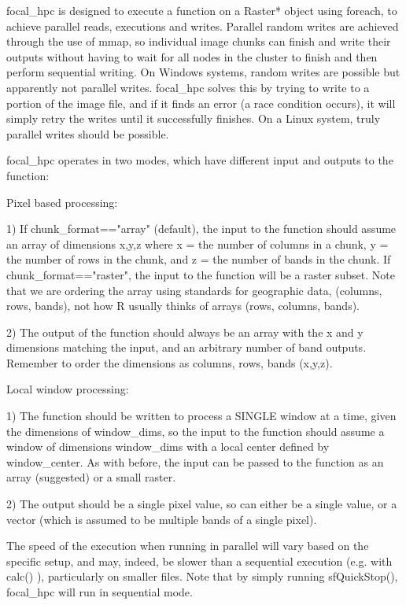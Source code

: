 \documentclass[a4paper]{book}
\begin{document}
\begin{Details}\relax
focal\_hpc is designed to execute a function on a Raster*
object using foreach, to achieve parallel reads,
executions and writes. Parallel random writes are
achieved through the use of mmap, so individual image
chunks can finish and write their outputs without having
to wait for all nodes in the cluster to finish and then
perform sequential writing.  On Windows systems, random
writes are possible but apparently not parallel writes.
focal\_hpc solves this by trying to write to a portion of
the image file, and if it finds an error (a race
condition occurs), it will simply retry the writes until
it successfully finishes.  On a Linux system, truly
parallel writes should be possible.

focal\_hpc operates in two modes, which have different
input and outputs to the function:

Pixel based processing:

1) If chunk\_format=="array" (default), the input to the
function should assume an array of dimensions x,y,z where
x = the number of columns in a chunk, y = the number of
rows in the chunk, and z = the number of bands in the
chunk.  If chunk\_format=="raster", the input to the
function will be a raster subset. Note that we are
ordering the array using standards for geographic data,
(columns, rows, bands), not how R usually thinks of
arrays (rows, columns, bands).

2) The output of the function should always be an array
with the x and y dimensions matching the input, and an
arbitrary number of band outputs.  Remember to order the
dimensions as columns, rows, bands (x,y,z).

Local window processing:

1) The function should be written to process a SINGLE
window at a time, given the dimensions of window\_dims, so
the input to the function should assume a window of
dimensions window\_dims with a local center defined by
window\_center.  As with before, the input can be passed
to the function as an array (suggested) or a small
raster.

2) The output should be a single pixel value, so can
either be a single value, or a vector (which is assumed
to be multiple bands of a single pixel).

The speed of the execution when running in parallel will
vary based on the specific setup, and may, indeed, be
slower than a sequential execution (e.g. with calc() ),
particularly on smaller files.  Note that by simply
running sfQuickStop(), focal\_hpc will run in sequential
mode.
\end{Details}
\end{document}
